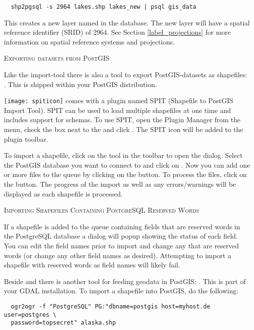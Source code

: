 \begin{verbatim} 
  shp2pgsql -s 2964 lakes.shp lakes_new | psql gis_data
\end{verbatim}

This creates a new layer named  in the
 database. The
new layer will have a spatial reference identifier (SRID) of 2964. See Section 
\ref{label_projections} for more information on spatial reference systems and
projections.
\begin{Tip}
\caption{\textsc{Exporting datasets from PostGIS}}
Like the import-tool  there is also a tool to export
PostGIS-datasets as shapefiles: . This is shipped within your
PostGIS distribution.
\end{Tip}

\texttt{[image: spiticon]} \qg comes with a
plugin named 
SPIT (Shapefile to PostGIS Import Tool).
SPIT can be used to load multiple shapefiles at one time and includes support
for schemas. To use SPIT, open the Plugin Manager from the 
menu, check the box next to the  and click . The SPIT
icon will be added to the plugin toolbar. 

To import a shapefile, click on the  tool in the 
toolbar to open the 
 dialog. Select the PostGIS database 
you want to connect to and click on . Now you can add one or more 
files to the queue by clicking on the  button. To process the files, 
click on the  button. The progress of the import as well as any 
errors/warnings will be displayed as each shapefile is processed.

\begin{Tip}\caption{\textsc{Importing Shapefiles Containing
PostgreSQL Reserved Words}}
If a shapefile is added to the queue containing fields that are
reserved words in the PostgreSQL database a dialog will popup showing the
status
of each field. You can edit the field names
prior to import and change any that are reserved words (or change any other
field names as desired). Attempting to
import a shapefile with reserved words as field names will likely fail.
\end{Tip} 

Beside  and  there is another tool for feeding
geodata in PostGIS: . This is part of your GDAL installation.
To import a shapefile into PostGIS, do the following:
\begin{verbatim}
  ogr2ogr -f "PostgreSQL" PG:"dbname=postgis host=myhost.de user=postgres \
  password=topsecret" alaska.shp
\end{verbatim}

